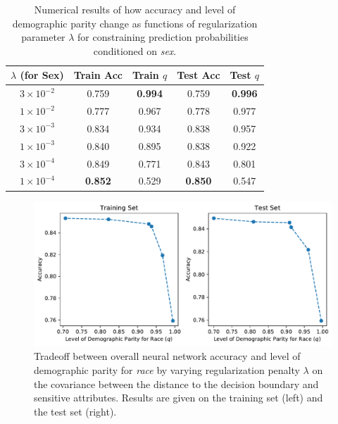 \documentclass{article}
\begin{document}
\begin{table}[ht]
\centering
\begin{tabular}{c|cc |cc} 
 \hline
 \hline
 $\lambda$ (for Sex) & Train Acc & Train $q$ & Test Acc & Test $q$ \\ 
 \hline
 $3 \times 10^{-2}$ & 0.759 & \textbf{0.994} & 0.759 & \textbf{0.996}\\
 $1 \times 10^{-2}$ &0.777& 0.967 & 0.778 & 0.977\\
$3 \times 10^{-3}$ & 0.834 & 0.934 & 0.838 & 0.957 \\
$1 \times 10^{-3}$ & 0.840 & 0.895 & 0.838 &0.922 \\
$3 \times 10^{-4}$ & 0.849 & 0.771 & 0.843 & 0.801\\
$1 \times 10^{-4}$ & \textbf{0.852} & 0.529 & \textbf{0.850} & 0.547\\
 \hline
\end{tabular}
\caption{Numerical results of how accuracy and level of demographic parity change as functions of regularization parameter $\lambda$ for constraining prediction probabilities conditioned on \emph{sex}.} \label{boundary-table-sex}
\end{table}

\begin{figure}[!ht]
\vskip 0.2in
\begin{center}
\centerline{\includegraphics[width=\columnwidth]{img/boundary-tradeoff-race.pdf}}
\caption{Tradeoff between overall neural network accuracy and level of demographic parity for \emph{race} by varying regularization penalty $\lambda$ on the covariance between the distance to the decision boundary and sensitive attributes.  Results are given on the training set (left) and the test set (right).}
\label{boundary-fig-race}
\end{center}
\vskip -0.2in
\end{figure}
\end{document}
